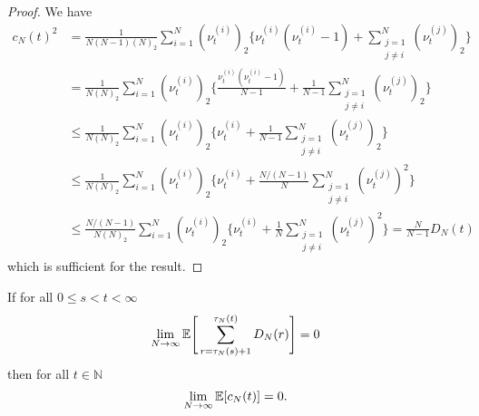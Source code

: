 \begin{proof}
We have
\begin{align*}
c_N( t )^2 &= \frac{ 1 }{ N ( N - 1 ) ( N )_2 } \sum_{ i = 1 }^N ( \nu_t^{(i)})_2 \Bigg\{ \nu_t^{(i)} ( \nu_t^{(i)} - 1 ) + \sum_{\substack{j=1\\ j \neq i }}^N ( \nu_t^{(j)} )_2 \Bigg\} \\
&= \frac{ 1 }{ N ( N )_2 } \sum_{ i = 1 }^N ( \nu_t^{(i)} )_2 \Bigg\{ \frac{ \nu_t^{(i)} ( \nu_t^{(i)} - 1 ) }{ N - 1 } + \frac{ 1 }{ N - 1 } \sum_{\substack{j=1\\ j \neq i }}^N ( \nu_t^{(j)} )_2 \Bigg\} \\
&\leq \frac{ 1 }{ N ( N )_2 } \sum_{ i = 1 }^N ( \nu_t^{(i)})_2 \Bigg\{ \nu_t^{(i)} + \frac{ 1 }{ N - 1 } \sum_{\substack{j=1\\ j \neq i }}^N ( \nu_t^{(j)} )_2 \Bigg\} \\
&\leq \frac{ 1 }{ N ( N )_2 } \sum_{ i = 1 }^N ( \nu_t^{(i)})_2 \Bigg\{ \nu_t^{(i)} + \frac{ N / ( N - 1 ) }{ N } \sum_{\substack{j=1\\ j \neq i }}^N ( \nu_t^{(j)} )^2 \Bigg\} \\
&\leq \frac{ N / ( N - 1 ) }{ N ( N )_2 } \sum_{ i = 1 }^N ( \nu_t^{(i)})_2 \Bigg\{ \nu_t^{(i)} + \frac{ 1 }{ N } \sum_{\substack{j=1\\ j \neq i }}^N ( \nu_t^{(j)} )^2 \Bigg\} = \frac{ N }{ N - 1 } D_N( t )
\end{align*}
which is sufficient for the result.
\end{proof}


\begin{lemma} \label{thm:DNimpliescN}
If for all $0 \leq s < t < \infty$
\begin{equation*}
\lim_{ N \rightarrow \infty } \mathbb{E}\Bigg[ \sum_{ r = \tau_N( s ) + 1 }^{ \tau_N( t ) } D_N( r ) \Bigg] = 0
\end{equation*}
then for all $ t \in \mathbb{N} $
\begin{equation*}
\lim_{ N \rightarrow \infty } \mathbb{E}[ c_N( t ) ] = 0 .
\end{equation*}
\end{lemma}

